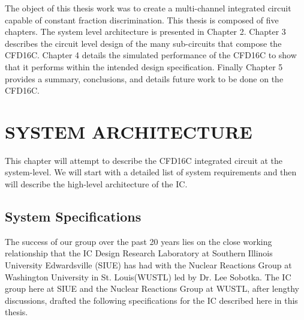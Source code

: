 \documentclass[12pt,oneside,final]{siuethesis}
\theoremstyle{definition}
\begin{document}
\par The object of this thesis work was to create a multi-channel integrated circuit capable of constant fraction discrimination. This thesis is composed of five chapters. The system level architecture is presented in Chapter 2. Chapter 3 describes the circuit level design of the many sub-circuits that compose the CFD16C. Chapter 4 details the simulated performance of the CFD16C to show that it performs within the intended design specification. Finally Chapter 5 provides a summary, conclusions, and details future work to be done on the CFD16C.



\chapter{SYSTEM ARCHITECTURE}

This chapter will attempt to describe the CFD16C integrated circuit at the system-level.  We will start with a detailed list of system requirements and then will describe the high-level architecture of the IC.

\section{System Specifications}
The success of our group over the past 20 years lies on the close working relationship that the IC Design Research Laboratory at Southern Illinois University Edwardsville (SIUE) has had with the Nuclear Reactions Group at Washington University in St. Louis(WUSTL) led by Dr. Lee Sobotka.  The IC group here at SIUE and the Nuclear Reactions Group at WUSTL, after lengthy discussions, drafted the following specifications for the IC described here in this thesis.
\end{document}
